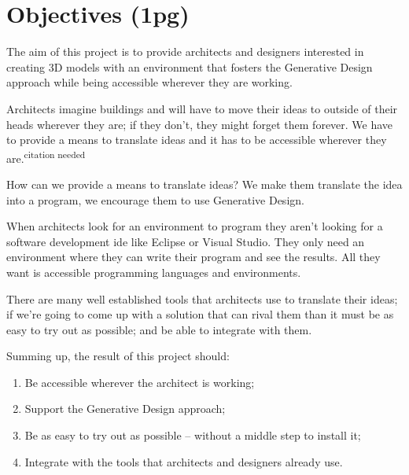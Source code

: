 \documentclass{./llncs2e/llncs}
\begin{document}
\section{Objectives (1pg)}
The aim of this project is to provide architects and designers interested in creating 3D models with an environment that fosters the Generative Design approach while being accessible wherever they are working.

Architects imagine buildings and will have to move their ideas to outside of their heads wherever they are; if they don't, they might forget them forever. We have to provide a means to translate ideas and it has to be accessible wherever they are.\textsuperscript{citation needed}

How can we provide a means to translate ideas? We make them translate the idea into a program, we encourage them to use Generative Design.

When architects look for an environment to program they aren't looking for a software development \ac{ide} like Eclipse or Visual Studio. They only need an environment where they can write their program and see the results. All they want is accessible programming languages and environments.

There are many well established tools that architects use to translate their ideas; if we're going to come up with a solution that can rival them than it must be as easy to try out as possible; and be able to integrate with them.

Summing up, the result of this project should:
\begin{enumerate}
	\item Be accessible wherever the architect is working; \label{obj:access}
	\item Support the Generative Design approach; \label{obj:gen-design}
	\item Be as easy to try out as possible -- without a middle step to install it; \label{obj:no-install}
	\item Integrate with the tools that architects and designers already use.\label{obj:inter-op}
\end{enumerate}
\end{document}
